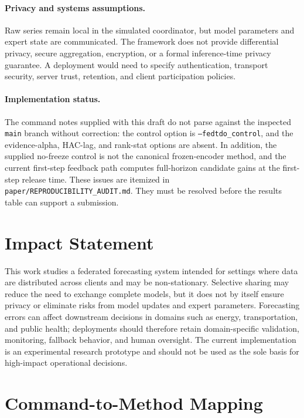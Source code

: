 \documentclass{article}
\theoremstyle{definition}
\begin{document}
\paragraph{Privacy and systems assumptions.}
Raw series remain local in the simulated coordinator, but model parameters and expert state are communicated. The framework does not provide differential privacy, secure aggregation, encryption, or a formal inference-time privacy guarantee. A deployment would need to specify authentication, transport security, server trust, retention, and client participation policies.

\paragraph{Implementation status.}
The command notes supplied with this draft do not parse against the inspected \texttt{main} branch without correction: the control option is \texttt{--fedtdo\_control}, and the evidence-alpha, HAC-lag, and rank-stat options are absent. In addition, the supplied no-freeze control is not the canonical frozen-encoder method, and the current first-step feedback path computes full-horizon candidate gains at the first-step release time. These issues are itemized in \texttt{paper/REPRODUCIBILITY\_AUDIT.md}. They must be resolved before the results table can support a submission.

\section*{Impact Statement}

This work studies a federated forecasting system intended for settings where data are distributed across clients and may be non-stationary. Selective sharing may reduce the need to exchange complete models, but it does not by itself ensure privacy or eliminate risks from model updates and expert parameters. Forecasting errors can affect downstream decisions in domains such as energy, transportation, and public health; deployments should therefore retain domain-specific validation, monitoring, fallback behavior, and human oversight. The current implementation is an experimental research prototype and should not be used as the sole basis for high-impact operational decisions.




\appendix

\section{Command-to-Method Mapping}
\end{document}
